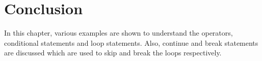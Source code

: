 

\section{Conclusion}
In this chapter, various examples are shown to understand the operators, conditional statements and loop statements. Also, continue and break statements are discussed which are used to skip and break the loops respectively. 